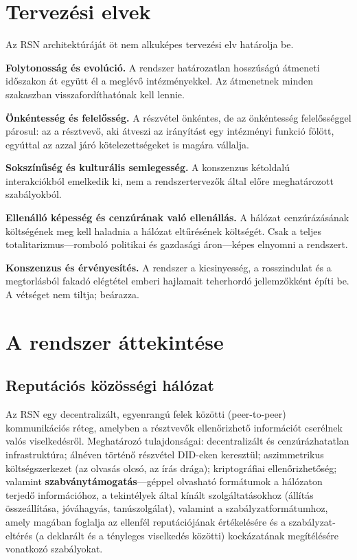 \documentclass[11pt,a4paper,twocolumn]{article}
\begin{document}
\section{Tervezési elvek}

Az RSN architektúráját öt nem alkuképes tervezési elv határolja be.

\textbf{Folytonosság és evolúció.} A rendszer határozatlan hosszúságú átmeneti időszakon át együtt él a meglévő intézményekkel. Az átmenetnek minden szakaszban visszafordíthatónak kell lennie.

\textbf{Önkéntesség és felelősség.} A részvétel önkéntes, de az önkéntesség felelősséggel párosul: az a résztvevő, aki átveszi az irányítást egy intézményi funkció fölött, egyúttal az azzal járó kötelezettségeket is magára vállalja.

\textbf{Sokszínűség és kulturális semlegesség.} A konszenzus kétoldalú interakciókból emelkedik ki, nem a rendszertervezők által előre meghatározott szabályokból.

\textbf{Ellenálló képesség és cenzúrának való ellenállás.} A hálózat cenzúrázásának költségének meg kell haladnia a hálózat eltűrésének költségét. Csak a teljes totalitarizmus---romboló politikai és gazdasági áron---képes elnyomni a rendszert.

\textbf{Konszenzus és érvényesítés.} A rendszer a kicsinyesség, a rosszindulat és a megtorlásból fakadó elégtétel emberi hajlamait teherhordó jellemzőkként építi be. A vétséget nem tiltja; beárazza.

\section{A rendszer áttekintése}

\subsection{Reputációs közösségi hálózat}

Az RSN egy decentralizált, egyenrangú felek közötti (peer-to-peer) kommunikációs réteg, amelyben a résztvevők ellenőrizhető információt cserélnek valós viselkedésről. Meghatározó tulajdonságai: decentralizált és cenzúrázhatatlan infrastruktúra; álnéven történő részvétel DID-eken keresztül; aszimmetrikus költségszerkezet (az olvasás olcsó, az írás drága); kriptográfiai ellenőrizhetőség; valamint \textbf{szabványtámogatás}---géppel olvasható formátumok a hálózaton terjedő információhoz, a tekintélyek által kínált szolgáltatásokhoz (állítás összeállítása, jóváhagyás, tanúszolgálat), valamint a szabályzatformátumhoz, amely magában foglalja az ellenfél reputációjának értékelésére és a szabályzat-eltérés (a deklarált és a tényleges viselkedés közötti) kockázatának megítélésére vonatkozó szabályokat.
\end{document}
